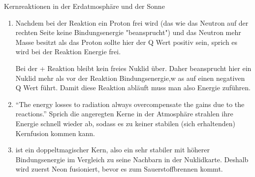 \documentclass{alex_hü}
\begin{document}
\begin{mybox}{Kernreaktionen in der Erdatmosphäre und der Sonne}
	\begin{enumerate}
		\item Nachdem bei der  Reaktion ein Proton frei wird (das wie das Neutron auf der rechten Seite keine Bindungsenergie "beansprucht") und das Neutron mehr Masse besitzt als das Proton sollte hier der Q Wert positiv sein, sprich es wird bei der Reaktion Energie frei.
		
		Bei der  +  Reaktion bleibt kein freies Nuklid über. Daher beansprucht hier ein Nuklid mehr als vor der Reaktion Bindungsenergie,w as auf einen negativen Q Wert führt. Damit diese Reaktion abläuft muss man also Energie zuführen.
	\tcbline
		\item “The energy losses to radiation always overcompensate the gains due to the reactions.” Sprich die angeregten Kerne in der Atmosphäre strahlen ihre Energie schnell wieder ab, sodass es zu keiner stabilen (sich erhaltenden) Kernfusion kommen kann.
	\tcbline
		\item {} ist ein doppeltmagischer Kern, also ein sehr stabiler mit höherer Bindungsenergie im Vergleich zu seine Nachbarn in der Nuklidkarte. Deshalb wird zuerst Neon fusioniert, bevor es zum Sauerstoffbrennen kommt.
	\end{enumerate}
\end{mybox}
\end{document}
